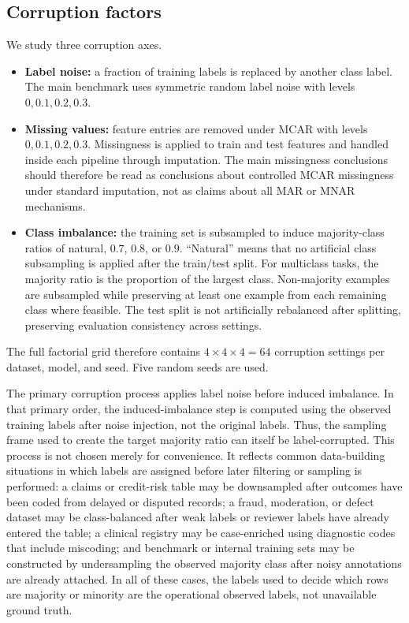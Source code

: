 \documentclass[preprint,12pt,number]{elsarticle}
\begin{document}
\subsection{Corruption factors}

We study three corruption axes.
\begin{itemize}
    \item \textbf{Label noise:} a fraction of training labels is replaced by another class label. The main benchmark uses symmetric random label noise with levels $0,0.1,0.2,0.3$.
    \item \textbf{Missing values:} feature entries are removed under MCAR with levels $0,0.1,0.2,0.3$. Missingness is applied to train and test features and handled inside each pipeline through imputation. The main missingness conclusions should therefore be read as conclusions about controlled MCAR missingness under standard imputation, not as claims about all MAR or MNAR mechanisms.
    \item \textbf{Class imbalance:} the training set is subsampled to induce majority-class ratios of natural, $0.7$, $0.8$, or $0.9$. ``Natural'' means that no artificial class subsampling is applied after the train/test split. For multiclass tasks, the majority ratio is the proportion of the largest class. Non-majority examples are subsampled while preserving at least one example from each remaining class where feasible. The test split is not artificially rebalanced after splitting, preserving evaluation consistency across settings.
\end{itemize}
The full factorial grid therefore contains $4\times4\times4=64$ corruption settings per dataset, model, and seed. Five random seeds are used.

The primary corruption process applies label noise before induced imbalance. In that primary order, the induced-imbalance step is computed using the observed training labels after noise injection, not the original labels. Thus, the sampling frame used to create the target majority ratio can itself be label-corrupted. This process is not chosen merely for convenience. It reflects common data-building situations in which labels are assigned before later filtering or sampling is performed: a claims or credit-risk table may be downsampled after outcomes have been coded from delayed or disputed records; a fraud, moderation, or defect dataset may be class-balanced after weak labels or reviewer labels have already entered the table; a clinical registry may be case-enriched using diagnostic codes that include miscoding; and benchmark or internal training sets may be constructed by undersampling the observed majority class after noisy annotations are already attached. In all of these cases, the labels used to decide which rows are majority or minority are the operational observed labels, not unavailable ground truth.
\end{document}
